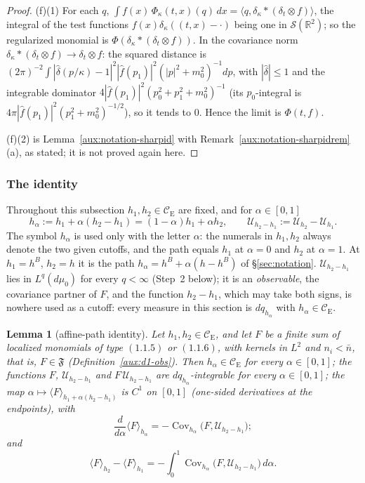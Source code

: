 \documentclass[11pt,a4paper]{article}
\theoremstyle{plain}
\newtheorem{lemma}[theorem]{Lemma}
\theoremstyle{definition}
\theoremstyle{plain}
\theoremstyle{definition}
\newcommand{\R}{\mathbb{R}}
\newcommand{\CE}{\mathcal{C}_{\mathrm E}}
\DeclareMathOperator{\Cov}{Cov}
\newcommand{\ev}[2]{\langle #1\rangle_{#2}}            %
\newcommand{\Uc}{\mathcal U}
\newcommand{\dmu}{d\mu_0}
\begin{document}
\begin{proof}
(f)(1) For each $q$, $\int f(x)\,\Phi_\kappa(t,x)(q)\,dx=\langle q,\delta_\kappa*(\delta_t\otimes
f)\rangle$, the integral of the test functions $f(x)\delta_\kappa((t,x)-\cdot)$ being one in
$\mathcal S(\R^2)$; so the regularized monomial is $\Phi(\delta_\kappa*(\delta_t\otimes f))$.  In
the covariance norm $\delta_\kappa*(\delta_t\otimes f)\to\delta_t\otimes f$: the squared distance
is $(2\pi)^{-2}\int|\hat\delta(p/\kappa)-1|^2|\hat f(p_1)|^2(|p|^2+m_0^2)^{-1}dp$, with
$|\hat\delta|\le1$ and the integrable dominator $4|\hat f(p_1)|^2(p_0^2+p_1^2+m_0^2)^{-1}$
(its $p_0$-integral is $4\pi|\hat f(p_1)|^2(p_1^2+m_0^2)^{-1/2}$), so it tends to $0$.  Hence the
limit is $\Phi(t,f)$.

(f)(2) is Lemma~\ref{aux:notation-sharpid} with Remark~\ref{aux:notation-sharpidrem}(a), as
stated; it is not proved again here.
\end{proof}

\subsubsection*{The identity}

Throughout this subsection $h_1,h_2\in\CE$ are fixed, and for $\alpha\in[0,1]$
\[
 h_\alpha:=h_1+\alpha(h_2-h_1)=(1-\alpha)h_1+\alpha h_2,\qquad
 \Uc_{h_2-h_1}:=\Uc_{h_2}-\Uc_{h_1} .
\]
The symbol $h_\alpha$ is used only with the letter $\alpha$: the numerals in $h_1,h_2$ always
denote the two given cutoffs, and the path equals $h_1$ at $\alpha=0$ and $h_2$ at $\alpha=1$.
At $h_1=h^B$, $h_2=h$ it is the path $h_\alpha=h^B+\alpha(h-h^B)$ of \S\ref{sec:notation}.
$\Uc_{h_2-h_1}$ lies in $L^q(\dmu)$ for every $q<\infty$ (Step~2 below); it is an
\emph{observable}, the covariance partner of $F$, and the function $h_2-h_1$, which may take
both signs, is nowhere used as a cutoff: every measure in this section is $dq_{h_\alpha}$
with $h_\alpha\in\CE$.

\begin{lemma}[affine-path identity]\label{lem:D1}
Let $h_1,h_2\in\CE$, and let $F$ be a finite sum of localized monomials of type $(1.1.5)$ or
$(1.1.6)$, with kernels in $L^2$ and $n_i<\bar n$, that is, $F\in\mathfrak F$
(Definition~\ref{aux:d1-obs}). Then $h_\alpha\in\CE$ for every $\alpha\in[0,1]$; the functions
$F$, $\Uc_{h_2-h_1}$ and $F\,\Uc_{h_2-h_1}$ are $dq_{h_\alpha}$-integrable for every
$\alpha\in[0,1]$; the map $\alpha\mapsto\ev{F}{h_1+\alpha(h_2-h_1)}$ is $C^1$ on $[0,1]$
(one-sided derivatives at the endpoints), with
\begin{equation}\label{eq:d1-deriv}
 \frac{d}{d\alpha}\ev{F}{h_\alpha}=-\Cov_{h_\alpha}\bigl(F,\Uc_{h_2-h_1}\bigr);
\end{equation}
and
\begin{equation}\label{eq:d1-identity}
 \ev{F}{h_2}-\ev{F}{h_1}=-\int_0^1\Cov_{h_\alpha}\bigl(F,\Uc_{h_2-h_1}\bigr)\,d\alpha .
\end{equation}
\end{lemma}
\end{document}
